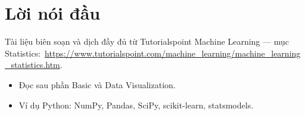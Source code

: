 \documentclass[12pt,a4paper]{article}
\newcommand{\tsurl}[1]{\url{#1}}
\begin{document}

\newpage
\tableofcontents
\newpage

\section*{Lời nói đầu}

\begin{ynghia}[title={Nguồn}]
Tài liệu biên soạn và dịch đầy đủ từ Tutorialspoint Machine Learning --- mục Statistics:\ \tsurl{https://www.tutorialspoint.com/machine_learning/machine_learning_statistics.htm}.
\end{ynghia}

\begin{phuongphap}[title={Cách dùng}]
\begin{itemize}
  \item Đọc sau phần Basic và Data Visualization.
  \item Ví dụ Python: NumPy, Pandas, SciPy, scikit-learn, statsmodels.
\end{itemize}
\end{phuongphap}

\newpage









\end{document}

